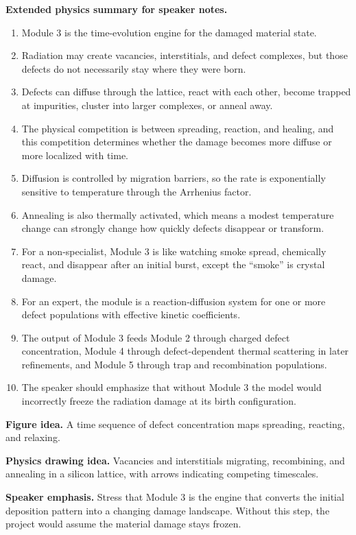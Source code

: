 \documentclass[11pt]{article}
\begin{document}
\textbf{Extended physics summary for speaker notes.}
\begin{enumerate}[leftmargin=1.6em]
    \item Module 3 is the time-evolution engine for the damaged material state.
    \item Radiation may create vacancies, interstitials, and defect complexes, but those defects do not necessarily stay where they were born.
    \item Defects can diffuse through the lattice, react with each other, become trapped at impurities, cluster into larger complexes, or anneal away.
    \item The physical competition is between spreading, reaction, and healing, and this competition determines whether the damage becomes more diffuse or more localized with time.
    \item Diffusion is controlled by migration barriers, so the rate is exponentially sensitive to temperature through the Arrhenius factor.
    \item Annealing is also thermally activated, which means a modest temperature change can strongly change how quickly defects disappear or transform.
    \item For a non-specialist, Module 3 is like watching smoke spread, chemically react, and disappear after an initial burst, except the ``smoke'' is crystal damage.
    \item For an expert, the module is a reaction-diffusion system for one or more defect populations with effective kinetic coefficients.
    \item The output of Module 3 feeds Module 2 through charged defect concentration, Module 4 through defect-dependent thermal scattering in later refinements, and Module 5 through trap and recombination populations.
    \item The speaker should emphasize that without Module 3 the model would incorrectly freeze the radiation damage at its birth configuration.
\end{enumerate}

\textbf{Figure idea.} A time sequence of defect concentration maps spreading, reacting, and relaxing.

\textbf{Physics drawing idea.} Vacancies and interstitials migrating, recombining, and annealing in a silicon lattice, with arrows indicating competing timescales.

\textbf{Speaker emphasis.} Stress that Module 3 is the engine that converts the initial deposition pattern into a changing damage landscape. Without this step, the project would assume the material damage stays frozen.
\end{document}
